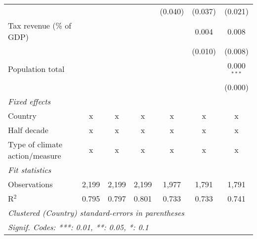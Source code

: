 \begin{tabular}{lcccccc}
                                                   &         &               &                & (0.040)        & (0.037)        & (0.021)\\   
   Tax revenue (\% of GDP)                         &         &               &                &                & 0.004          & 0.008\\   
                                                   &         &               &                &                & (0.010)        & (0.008)\\   
   Population total                                &         &               &                &                &                & 0.000$^{***}$\\   
                                                   &         &               &                &                &                & (0.000)\\   
   \emph{Fixed effects}\\
   Country                                         & x       & x             & x              & x              & x              & x\\  
   Half decade                                     & x       & x             & x              & x              & x              & x\\  
   Type of climate action/measure                  & x       & x             & x              & x              & x              & x\\  
   \midrule \emph{Fit statistics}\\
   Observations                                    & 2,199   & 2,199         & 2,199          & 1,977          & 1,791          & 1,791\\  
   R$^2$                                           & 0.795   & 0.797         & 0.801          & 0.733          & 0.733          & 0.741\\  
   \midrule
   \multicolumn{7}{l}{\emph{Clustered (Country) standard-errors in parentheses}}\\
   \multicolumn{7}{l}{\emph{Signif. Codes: ***: 0.01, **: 0.05, *: 0.1}}\\
\end{tabular}
\par\endgroup



